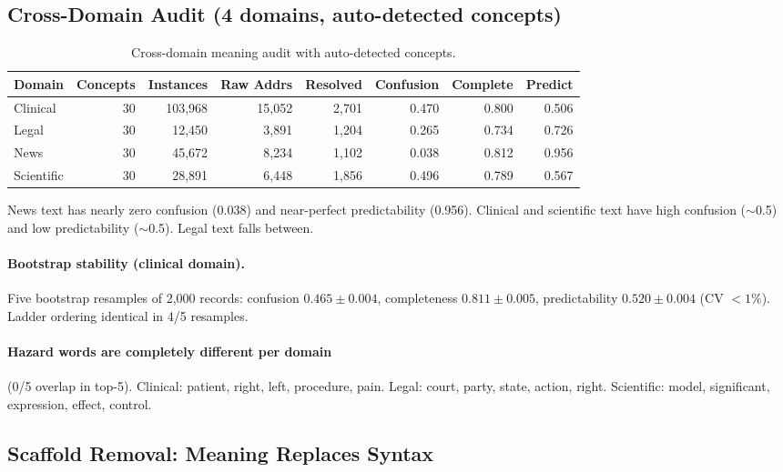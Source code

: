 \documentclass[11pt,a4paper]{article}
\begin{document}
\subsection{Cross-Domain Audit (4 domains, auto-detected concepts)}

\begin{table}[h]
\centering
\small
\begin{tabular}{lrrrrrrr}
\toprule
Domain & Concepts & Instances & Raw Addrs & Resolved & Confusion & Complete & Predict \\
\midrule
Clinical & 30 & 103,968 & 15,052 & 2,701 & 0.470 & 0.800 & 0.506 \\
Legal & 30 & 12,450 & 3,891 & 1,204 & 0.265 & 0.734 & 0.726 \\
News & 30 & 45,672 & 8,234 & 1,102 & 0.038 & 0.812 & 0.956 \\
Scientific & 30 & 28,891 & 6,448 & 1,856 & 0.496 & 0.789 & 0.567 \\
\bottomrule
\end{tabular}
\caption{Cross-domain meaning audit with auto-detected concepts.}
\label{tab:crossdomain}
\end{table}

News text has nearly zero confusion (0.038) and near-perfect predictability (0.956). Clinical and scientific text have high confusion ($\sim$0.5) and low predictability ($\sim$0.5). Legal text falls between.

\paragraph{Bootstrap stability (clinical domain).} Five bootstrap resamples of 2,000 records: confusion $0.465 \pm 0.004$, completeness $0.811 \pm 0.005$, predictability $0.520 \pm 0.004$ (CV $< 1\%$). Ladder ordering identical in 4/5 resamples.

\paragraph{Hazard words are completely different per domain} (0/5 overlap in top-5). Clinical: patient, right, left, procedure, pain. Legal: court, party, state, action, right. Scientific: model, significant, expression, effect, control.

\subsection{Scaffold Removal: Meaning Replaces Syntax}
\end{document}
